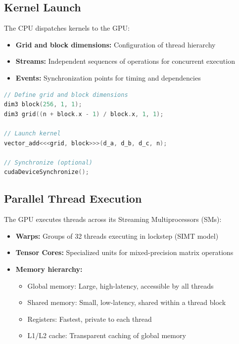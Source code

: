 \documentclass[11pt]{article}
\begin{document}
\subsection{Kernel Launch}
The CPU dispatches kernels to the GPU:
\begin{itemize}
    \item \textbf{Grid and block dimensions:} Configuration of thread hierarchy
    \item \textbf{Streams:} Independent sequences of operations for concurrent execution
    \item \textbf{Events:} Synchronization points for timing and dependencies
\end{itemize}

\lstset{style=cppstyle}
\begin{lstlisting}[caption=CUDA Kernel Launch, language=C++]
// Define grid and block dimensions
dim3 block(256, 1, 1);
dim3 grid((n + block.x - 1) / block.x, 1, 1);

// Launch kernel
vector_add<<<grid, block>>>(d_a, d_b, d_c, n);

// Synchronize (optional)
cudaDeviceSynchronize();
\end{lstlisting}

\subsection{Parallel Thread Execution}
The GPU executes threads across its Streaming Multiprocessors (SMs):

\begin{itemize}
    \item \textbf{Warps:} Groups of 32 threads executing in lockstep (SIMT model)
    \item \textbf{Tensor Cores:} Specialized units for mixed-precision matrix operations
    \item \textbf{Memory hierarchy:}
    \begin{itemize}
        \item Global memory: Large, high-latency, accessible by all threads
        \item Shared memory: Small, low-latency, shared within a thread block
        \item Registers: Fastest, private to each thread
        \item L1/L2 cache: Transparent caching of global memory
    \end{itemize}
\end{itemize}
\end{document}
